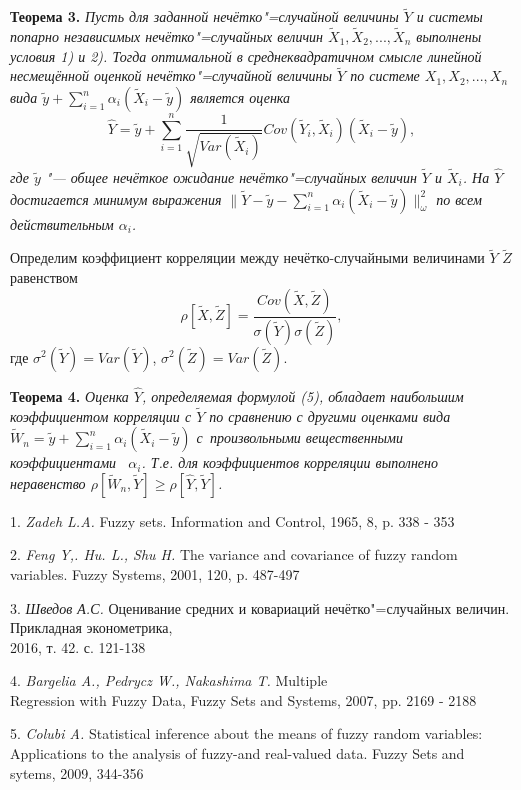 \textbf{Теорема 3.} \textit{Пусть для заданной нечётко"=случайной
величины $\tilde{Y}$ и системы попарно независимых
нечётко"=случайных величин $\tilde{X}_1, \tilde{X}_2,..., \tilde{X}_n$ выполнены условия 1) и 2). Тогда оптимальной в среднеквадратичном смысле линейной несмещённой оценкой нечётко"=случайной величины $\tilde{Y}$ по системе $X_1, X_2,..., X_n$ вида $\tilde{y}+\sum\limits_{i=1}^n\alpha_i(\tilde{X}_i - \tilde{y})$ является оценка }
\begin{equation}
\hat{Y} = \tilde{y} + \sum\limits_{i=1}^n\frac{1}{\sqrt{Var(\tilde{X}_i)}}Cov(\tilde{Y}_i, \tilde{X}_i)(\tilde{X}_i-\tilde{y}),
\end{equation}
\textit{где $\tilde{y}$ "--- общее нечёткое ожидание нечётко"=случайных величин $\tilde{Y}$ и $\tilde{X}_i$. На $\hat{Y}$ достигается минимум выражения $\|\tilde{Y} - \tilde{y} -\sum\limits_{i=1}^n\alpha_i(\tilde{X}_i-\tilde{y})\|_{\omega}^2$ по всем действительным $\alpha_i$.}

Определим коэффициент корреляции между нечётко-\lb случайными величинами $\tilde{Y}$ $\tilde{Z}$ равенством
$$
\rho[\tilde{X}, \tilde{Z}] = \frac{Cov(\tilde{X}, \tilde{Z})}{\sigma(\tilde{Y})\sigma(\tilde{Z})},
$$
где $\sigma^2(\tilde{Y}) = Var(\tilde{Y})$, $\sigma^2(\tilde{Z}) = Var(\tilde{Z})$.

\textbf{Теорема 4.} \textit{Оценка $\hat{Y}$, определяемая формулой (5),
обладает наибольшим коэффициентом корреляции с $\tilde{Y}$
по сра\-в\-не\-нию с другими оценками вида $\tilde{W}_n = \tilde{y} + \sum\limits_{i=1}^n\alpha_i(\tilde{X}_i - \tilde{y})$
с~произвольными вещественными коэффициентами ~$\alpha_i$.
\linebreak
Т.е. для коэффициентов корреляции выполнено неравенство
\linebreak
$\rho[\tilde{W}_n, \tilde{Y}]\geq \rho[\hat{Y},\tilde{Y}] $. }

\litlist

1. {\it Zadeh L.A.} Fuzzy sets. Information and Control, 1965, 8, p. 338 - 353

2. {\it Feng Y,. Hu. L., Shu H.} The variance and covariance of fuzzy random variables. Fuzzy Systems,
2001, 120, p. 487-497

3. {\it Шведов А.С.} Оценивание средних и ковариаций
нечётко"=случайных величин. Прикладная эконометрика,
\\2016, т. 42. с. 121-138

4. {\it Bargelia A., Pedrycz W., Nakashima T.} Multiple
\\Regression with Fuzzy Data, Fuzzy Sets and Systems, 2007, pp. 2169 - 2188

5. {\it Colubi A.} Statistical inference about the means of fuzzy random variables: Applications to the analysis of fuzzy-and real-valued data. Fuzzy Sets and sytems, 2009, 344-356
